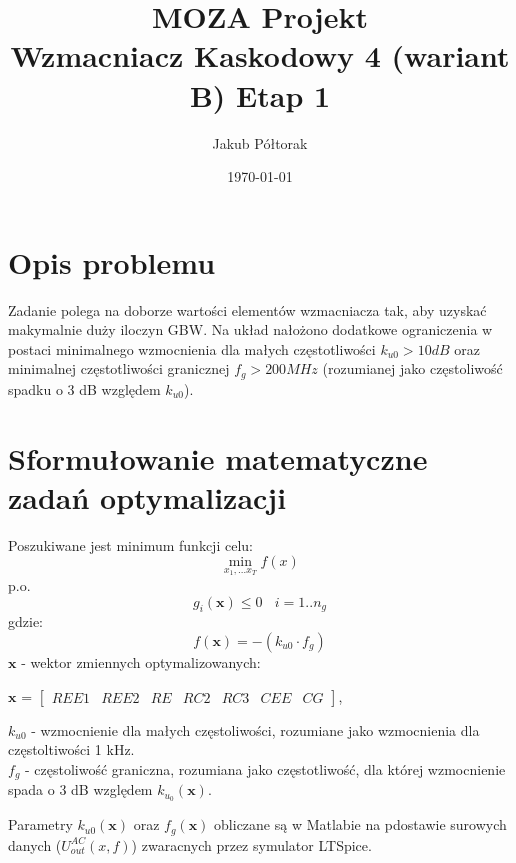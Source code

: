 \documentclass{article}
\title{\huge  \Huge \textbf{MOZA Projekt} \\ \textbf{Wzmacniacz Kaskodowy 4 (wariant B)}}
\date{\today}
\author{ \LARGE Jakub Półtorak}
\begin{document}
\maketitle
{}
\newpage
{}
\tableofcontents

\pagebreak

\begin{center}
	\title{ \huge \textbf{Etap 1}}
\end{center}


\section*{Opis problemu}
Zadanie polega na doborze wartości elementów wzmacniacza tak, aby uzyskać makymalnie duży iloczyn
GBW. Na układ nałożono dodatkowe ograniczenia w postaci minimalnego wzmocnienia dla małych częstotliwości $k_{u0} > 10 dB$ oraz minimalnej częstotliwości
granicznej $f_g > 200 MHz$ (rozumianej jako częstoliwość spadku o 3 dB względem $k_{u0}$).
\section{Sformułowanie matematyczne zadań optymalizacji}
Poszukiwane jest minimum funkcji celu:
\[ \min\limits_{x_1,\dots x_T} f(x) \]
p.o.
\[ g_{i}(\textbf{x}) \leq 0 \ \ \ \  i=1..n_g\]
gdzie:
\[ f(\textbf{x}) = -(k_{u0}\cdot f_g)\]
\(\textbf{x}\) - wektor zmiennych optymalizowanych: \\
\begin{center}
	$\textbf{x}$ =
	$\begin{bmatrix}
			REE1 & REE2 & RE & RC2 & RC3 & CEE & CG
		\end{bmatrix}$,
\end{center}
\(k_{u0}\) - wzmocnienie dla małych częstoliwości, rozumiane jako wzmocnienia dla częstoltiwości 1 kHz.\\
\(f_{g}\) - częstoliwość graniczna, rozumiana jako częstotliwość, dla której wzmocnienie
spada o 3 dB względem $k_{u_{0}}(\textbf{x}) $.

Parametry $k_{u0}(\textbf{x})$ oraz $f_g(\textbf{x})$ obliczane są w Matlabie na pdostawie surowych danych ($U^{AC}_{out}(x,f)$) zwaracnych
przez symulator LTSpice.
\end{document}
